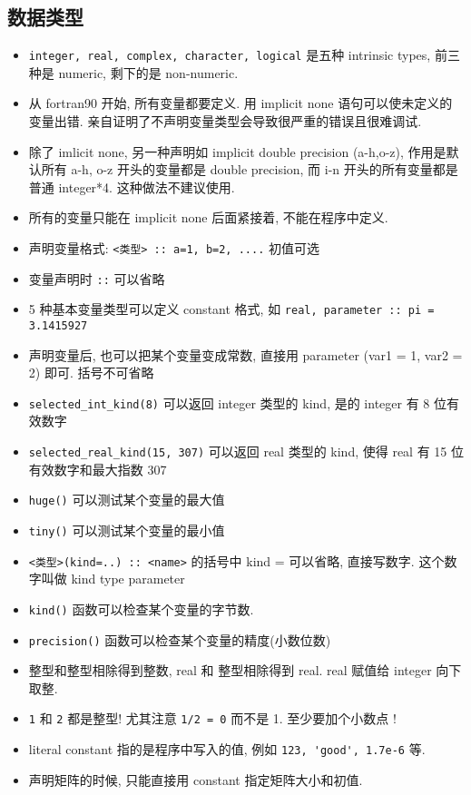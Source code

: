 \subsection{数据类型}
\begin{itemize}
\item \verb`integer, real, complex, character, logical` 是五种 intrinsic types, 前三种是 numeric, 剩下的是 non-numeric.
\item 从 fortran90 开始, 所有变量都要定义. 用 implicit none 语句可以使未定义的变量出错. 亲自证明了不声明变量类型会导致很严重的错误且很难调试.
\item 除了 imlicit none, 另一种声明如 implicit double precision (a-h,o-z), 作用是默认所有 a-h, o-z 开头的变量都是 double precision, 而 i-n 开头的所有变量都是普通 integer*4. 这种做法不建议使用.
\item 所有的变量只能在 implicit none 后面紧接着, 不能在程序中定义.
\item 声明变量格式:  \verb`<类型> :: a=1, b=2, ....`  初值可选
\item 变量声明时 \verb`::` 可以省略
\item 5 种基本变量类型可以定义 constant 格式, 如  \verb`real, parameter :: pi = 3.1415927`
\item 声明变量后, 也可以把某个变量变成常数, 直接用 parameter (var1 = 1, var2 = 2) 即可. 括号不可省略
\item \verb`selected_int_kind(8)` 可以返回 integer 类型的 kind, 是的 integer 有 8 位有效数字
\item \verb`selected_real_kind(15, 307)` 可以返回 real 类型的 kind, 使得 real 有 15 位有效数字和最大指数 307
\item \verb`huge()` 可以测试某个变量的最大值
\item \verb`tiny()` 可以测试某个变量的最小值
\item \verb`<类型>(kind=..) :: <name>` 的括号中 kind = 可以省略, 直接写数字. 这个数字叫做 kind type parameter
\item \verb`kind()` 函数可以检查某个变量的字节数.
\item \verb`precision()` 函数可以检查某个变量的精度(小数位数)
\item 整型和整型相除得到整数, real 和 整型相除得到 real. real 赋值给 integer 向下取整.
\item \verb`1` 和 \verb`2` 都是整型! 尤其注意 \verb`1/2 = 0` 而不是 1.   至少要加个小数点 !
\item literal constant 指的是程序中写入的值, 例如 \verb`123, 'good', 1.7e-6` 等.
\item 声明矩阵的时候, 只能直接用 constant 指定矩阵大小和初值.
\end{itemize}

